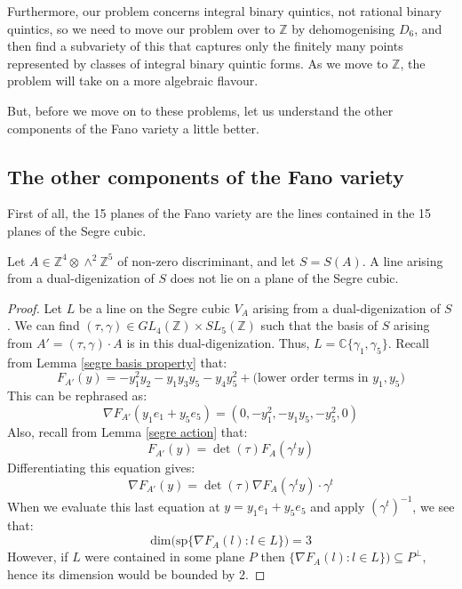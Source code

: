 \documentclass{report}
\begin{document}
Furthermore, our problem concerns integral binary quintics, not rational binary quintics, so we need to move our problem over to $\mathbb{Z}$ by dehomogenising $D_6$, and then find a subvariety of this that captures only the finitely many points represented by classes of integral binary quintic forms.  As we move to $\mathbb{Z}$, the problem will take on a more algebraic flavour.

But, before we move on to these problems, let us understand the other components of the Fano variety a little better.

\subsection{The other components of the Fano variety}

First of all, the 15 planes of the Fano variety are the lines contained in the 15 planes of the Segre cubic.

\begin{lemma} \label{not plane}
Let $A \in \mathbb{Z}^4 \otimes \wedge^2 \mathbb{Z}^5$ of non-zero discriminant, and let $S = S(A)$.  A line arising from a dual-digenization of $S$ does not lie on a plane of the Segre cubic.
\end{lemma}
\begin{proof}
Let $L$ be a line on the Segre cubic $V_A$ arising from a dual-digenization of $S$.  We can find $(\tau, \gamma) \in GL_4(\mathbb{Z}) \times SL_5(\mathbb{Z})$ such that the basis of $S$ arising from $A' = (\tau, \gamma) \cdot A$ is in this dual-digenization.  Thus, $L = \mathbb{C}\{\gamma_1,\gamma_5\}$.  Recall from Lemma \ref{segre basis property} that:
\begin{equation}
F_{A'}(y) = - y_1^2 y_2 - y_1 y_3 y_5 - y_4 y_5^2 + \text{(lower order terms in $y_1, y_5$)}
\end{equation}
This can be rephrased as:
\begin{equation}
\nabla F_{A'}(y_1 e_1 + y_5 e_5) = (0, - y_1^2, - y_1 y_5, - y_5^2, 0)
\end{equation}
Also, recall from Lemma \ref{segre action} that:
\begin{equation}
F_{A'}(y) = \det(\tau) F_A(\gamma^t y)
\end{equation}
Differentiating this equation gives:
\begin{equation}
\nabla F_{A'} (y) = \det(\tau) \nabla F_A (\gamma^t y) \cdot \gamma^t
\end{equation}
When we evaluate this last equation at $y = y_1 e_1 + y_5 e_5$ and apply $(\gamma^t)^{-1}$, we see that:
\begin{equation}
\text{dim(sp} \{ \nabla F_{A} ( l ) : l \in L \}) = 3
\end{equation}
However, if $L$ were contained in some plane $P$ then $\{ \nabla F_A ( l ) : l \in L \}) \subseteq P^\perp$, hence its dimension would be bounded by 2.
\end{proof}
\end{document}
